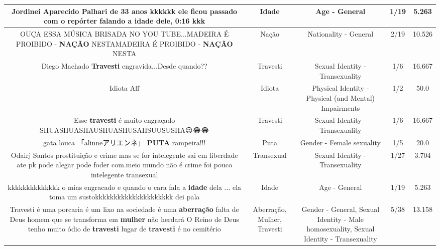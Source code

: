\documentclass[11pt]{article}
\newlength\mylength
\begin{document}
\begin{center}
\begin{longtable}{|C{.65\mylength}|C{.30\mylength}|C{.12\mylength}|C{.12\mylength}|C{.12\mylength}|}
  \small Jordinei Aparecido Palhari de 33 anos kkkkkk ele ficou passado com o repórter falando a \textbf{idade} dele, 0:16 kkk\normalsize   & Idade & Age - General & 1/19 & 5.263 \\  \hline
  \small OUÇA ESSA MÚSICA BRISADA NO YOU TUBE...MADEIRA É PROIBIDO - \textbf{NAÇÃO} NESTAMADEIRA É PROIBIDO - \textbf{NAÇÃO} NESTA\normalsize   & Nação & Nationality - General & 2/19 & 10.526 \\  \hline
  \small Diego Machado \textbf{Travesti} engravida...Desde quando??\normalsize   & Travesti & Sexual Identity - Transexuality & 1/6 & 16.667 \\  \hline
  \small Idiota Aff\normalsize   & Idiota & Physical Identity - Physical (and Mental) Impairments & 1/2 & 50.0 \\  \hline
  \small Esse \textbf{travesti} é muito engraçado SHUASHUASHAUSHUASHUSAHSUUSUSHA😉😂😂\normalsize   & Travesti & Sexual Identity - Transexuality & 1/6 & 16.667 \\  \hline
  \small gata louca 「alinneアリエンネ」 \textbf{PUTA} rampeira!!!\normalsize   & Puta & Gender - Female sexuality & 1/5 & 20.0 \\  \hline
  \small Odairj Santos prostituição  e crime  mas se for intelegente sai em liberdade  ate pk pode alegar  pode foder  com.meio mundo não  é  crime foi pouco intelegente transexual\normalsize   & Transexual & Sexual Identity - Transexuality & 1/27 & 3.704 \\  \hline
  \small kkkkkkkkkkkkkk o mias engracado e quando o cara fala a \textbf{idade} dela ... ela toma um sustokkkkkkkkkkkkkkkkkkkkk dei pala\normalsize   & Idade & Age - General & 1/19 & 5.263 \\  \hline
  \small Travesti é uma porcaria é um lixo na sociedade é uma \textbf{aberração} falta de Deus homem que se transforma em \textbf{mulher} não herdará  O Reino de Deus tenho muito ódio de \textbf{travesti} lugar de \textbf{travesti} é no cemitério\normalsize   & Aberração, Mulher, Travesti & Gender - General, Sexual Identity - Male homosexuality, Sexual Identity - Transexuality & 5/38 & 13.158 \\  \hline

\end{longtable}
\end{center}
\end{document}
